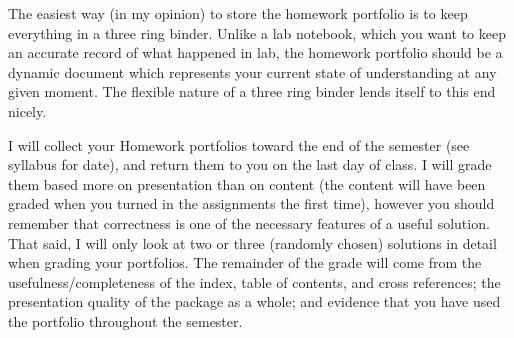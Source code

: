 \documentclass{article}
\begin{document}
The easiest way (in my opinion) to store the homework portfolio is to
keep everything in a three ring binder.  Unlike a lab notebook, which
you want to keep an accurate record of what happened in lab, the
homework portfolio should be a dynamic document which represents your
current state of understanding at any given moment.  The flexible
nature of a three ring binder lends itself to this end nicely.

I will collect your Homework portfolios toward the end of the semester
(see syllabus for date), and return them to you on the last day of
class.  I will grade them based more on presentation than on content
(the content will have been graded when you turned in the assignments
the first time), however you should remember that correctness is one
of the necessary features of a useful solution.  That said, I will
only look at two or three (randomly chosen) solutions in detail when
grading your portfolios.  The remainder of the grade will come from
the usefulness/completeness of the index, table of contents, and cross
references; the presentation quality of the package as a whole; and
evidence that you have used the portfolio throughout the semester.
\end{document}
